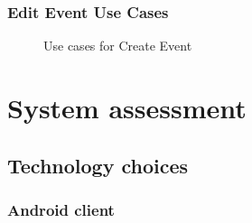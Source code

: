 \documentclass{article}
\begin{document}
		\subsubsection{Edit Event Use Cases}
			\begin{figure}[H]
				\caption{Use cases for Create Event}
			\end{figure}
	
	\pagebreak
	
	\section{System assessment}	
	
		\subsection{Technology choices}
		
		\subsubsection{Android client}
		
\end{document}
